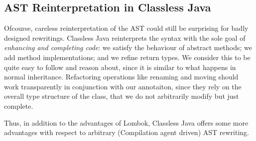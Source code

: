 \subsection{AST Reinterpretation in Classless Java}

Ofcourse, careless reinterpretation of the AST could still be
surprising for badly designed rewritings.  Classless Java reinterprets
the syntax with the sole goal of \emph{enhancing and completing code}:
we satisfy the behaviour of abstract methods; we add method
implementations; and we refine return types.  We consider this to be
quite easy to follow and reason about, since it is similar to what
happens in normal inheritance.  Refactoring operations like renaming
and moving should work transparently in conjunction with our
annotaiton, since they rely on the overall type structure of the
class, that we do not arbitrarily modify but just complete.

Thus, in addition to the advantages of Lombok, Classless Java offers
some more advantages with respect to arbitrary (Compilation agent driven) AST rewriting.



